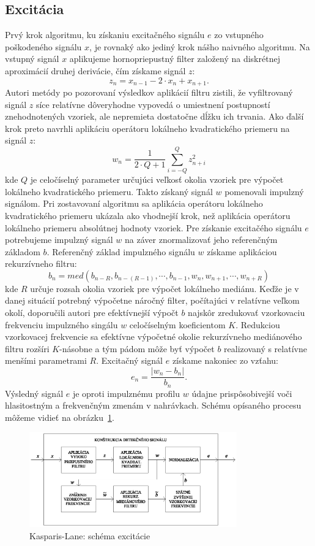 \subsection{Excitácia}
Prvý krok algoritmu, ku získaniu excitačného signálu $e$ zo vstupného poškodeného signálu $x$, je rovnaký ako jediný krok nášho naivného algoritmu. Na vstupný signál $x$ aplikujeme hornopriepustný filter založený na diskrétnej aproximácií druhej derivácie, čím získame signál $z$:
$$z_n = x_{n-1} - 2 \cdot x_n + x_{n+1}.$$
Autori metódy po pozorovaní výsledkov aplikácií filtru zistili, že vyfiltrovaný signál $z$ síce relatívne dôveryhodne vypovedá o umiestnení postupností znehodnotených vzoriek, ale nepremieta dostatočne dĺžku ich trvania. Ako ďalší krok preto navrhli aplikáciu operátoru lokálneho kvadratického priemeru na signál $z$:
$$w_n=\frac{1}{2 \cdot Q+1}\sum_{i=-Q}^Q z_{n+i}^2$$ 
kde $Q$ je celočíselný parameter určujúci veľkosť okolia vzoriek pre výpočet lokálneho kvadratického priemeru. Takto získaný signál $w$ pomenovali impulzný signálom. Pri zostavovaní algoritmu sa aplikácia operátoru lokálneho kvadratického priemeru ukázala ako vhodnejší krok, než aplikácia operátoru lokálneho priemeru absolútnej hodnoty vzoriek. Pre získanie excitačého signálu $e$ potrebujeme impulzný signál $w$ na záver znormalizovať jeho referenčným základom $b$. Referenčný základ impulzného signálu $w$ získame aplikáciou rekurzívneho filtru:
$$b_n=med(b_{n-R}, b_{n-(R-1)}, \cdots, b_{n-1}, w_n, w_{n+1}, \cdots, w_{n+R})$$ 
kde $R$ určuje rozsah okolia vzoriek pre výpočet lokálneho mediánu. Keďže je v danej situácií potrebný výpočetne náročný filter, počítajúci v relatívne veľkom okolí, doporučili autori pre efektívnejší výpočt $b$ najskôr zredukovať vzorkovaciu frekvenciu impulzného singálu $w$ celočíselným koeficientom $K$. Redukciou vzorkovacej frekvencie sa efektívne výpočetné okolie rekurzívneho mediánového filtru rozšíri $K$-násobne a tým pádom môže byť výpočet $b$ realizovaný s relatívne menšími parametrami $R$. Excitačný signál $e$ získame nakoniec zo vzťahu: 
$$e_n = \frac{|w_n - b_n|}{b_n}.$$ 
Výsledný signál $e$ je oproti impulznému profilu $w$ údajne prispôsobivejší voči hlasitostným a frekvenčným zmenám v nahrávkach. Schému opísaného procesu môžeme vidieť na obrázku~\ref{obrazok:kasparis-lane}.

\begin{figure}[!h]
	\centering
	\includegraphics[width=0.8\textwidth]{images/kasparis.eps}
	\caption{Kasparis-Lane: schéma excitácie}
	\label{obrazok:kasparis-lane}
\end{figure}

